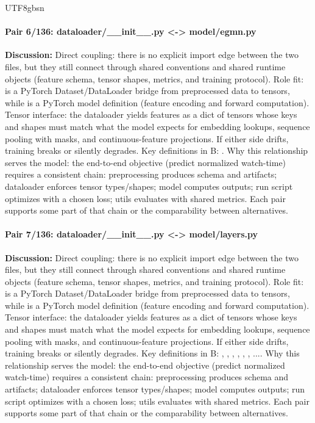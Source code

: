 \documentclass[11pt]{article}
\begin{document}
\begin{CJK*}{UTF8}{gbsn}
\paragraph{Pair 6/136: dataloader/\_\_init\_\_.py <-> model/egmn.py}
\textbf{Discussion:} Direct coupling: there is no explicit import edge between the two files, but they still connect through shared conventions and shared runtime objects (feature schema, tensor shapes, metrics, and training protocol). Role fit: \texttt{} is a PyTorch Dataset/DataLoader bridge from preprocessed data to tensors, while \texttt{} is a PyTorch model definition (feature encoding and forward computation). Tensor interface: the dataloader yields features as a dict of tensors whose keys and shapes must match what the model expects for embedding lookups, sequence pooling with masks, and continuous-feature projections. If either side drifts, training breaks or silently degrades. Key definitions in B: \texttt{}. Why this relationship serves the model: the end-to-end objective (predict normalized watch-time) requires a consistent chain: preprocessing produces schema and artifacts; dataloader enforces tensor types/shapes; model computes outputs; run script optimizes with a chosen loss; utils evaluates with shared metrics. Each pair supports some part of that chain or the comparability between alternatives.

\paragraph{Pair 7/136: dataloader/\_\_init\_\_.py <-> model/layers.py}
\textbf{Discussion:} Direct coupling: there is no explicit import edge between the two files, but they still connect through shared conventions and shared runtime objects (feature schema, tensor shapes, metrics, and training protocol). Role fit: \texttt{} is a PyTorch Dataset/DataLoader bridge from preprocessed data to tensors, while \texttt{} is a PyTorch model definition (feature encoding and forward computation). Tensor interface: the dataloader yields features as a dict of tensors whose keys and shapes must match what the model expects for embedding lookups, sequence pooling with masks, and continuous-feature projections. If either side drifts, training breaks or silently degrades. Key definitions in B: \texttt{}, \texttt{}, \texttt{}, \texttt{}, \texttt{}, \texttt{}, .... Why this relationship serves the model: the end-to-end objective (predict normalized watch-time) requires a consistent chain: preprocessing produces schema and artifacts; dataloader enforces tensor types/shapes; model computes outputs; run script optimizes with a chosen loss; utils evaluates with shared metrics. Each pair supports some part of that chain or the comparability between alternatives.


\end{CJK*}
\end{document}
